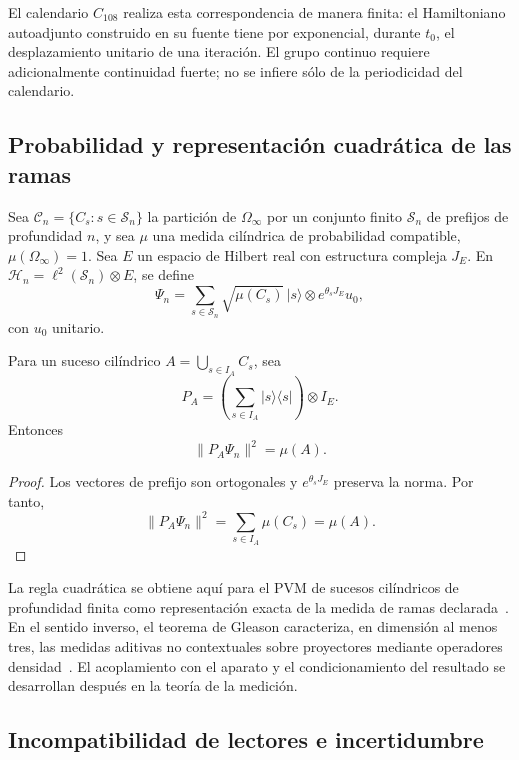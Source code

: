 El calendario \(C_{108}\) realiza esta correspondencia de manera finita:
el Hamiltoniano autoadjunto construido en su fuente tiene por
exponencial, durante \(t_0\), el desplazamiento unitario de una iteración. El
grupo continuo requiere adicionalmente continuidad fuerte; no se infiere
sólo de la periodicidad del calendario.

\subsection{Probabilidad y representación cuadrática de las ramas}

Sea \(\mathcal C_n=\{C_s:s\in\mathcal S_n\}\) la partición de
\(\Omega_\infty\) por un conjunto finito \(\mathcal S_n\) de prefijos de
profundidad \(n\), y sea \(\mu\) una medida cilíndrica de probabilidad
compatible, \(\mu(\Omega_\infty)=1\). Sea \(E\) un espacio de Hilbert real
con estructura compleja \(J_E\). En
\(\mathcal H_n=\ell^2(\mathcal S_n)\otimes E\), se define
\begin{equation}
 \Psi_n=\sum_{s\in\mathcal S_n}
 \sqrt{\mu(C_s)}\,|s\rangle\otimes e^{\theta_s J_E}u_0,
 \label{eq:estado-amplitudes-medida-rev2}
\end{equation}
con \(u_0\) unitario.

\begin{theorem}
\label{thm:born-cilindrico-rev2}
Para un suceso cilíndrico
\(A=\bigcup_{s\in I_A}C_s\), sea
\[
 P_A=\left(\sum_{s\in I_A}|s\rangle\langle s|\right)\otimes I_E.
\]
Entonces
\[
 \|P_A\Psi_n\|^2=\mu(A).
\]
\end{theorem}

\begin{proof}
Los vectores de prefijo son ortogonales y
\(e^{\theta_s J_E}\) preserva la norma. Por tanto,
\[
 \|P_A\Psi_n\|^2
 =\sum_{s\in I_A}\mu(C_s)=\mu(A).
\]
\end{proof}

La regla cuadrática se obtiene aquí para el PVM de sucesos cilíndricos de
profundidad finita como representación exacta de la medida de ramas
declarada~\cite{Born1926}. En el sentido inverso, el teorema de Gleason
caracteriza, en dimensión al menos tres, las medidas aditivas no contextuales
sobre proyectores mediante operadores densidad~\cite{Gleason1957}. El
acoplamiento con el aparato y el condicionamiento del resultado se desarrollan
después en la teoría de la medición.

\subsection{Incompatibilidad de lectores e incertidumbre}

